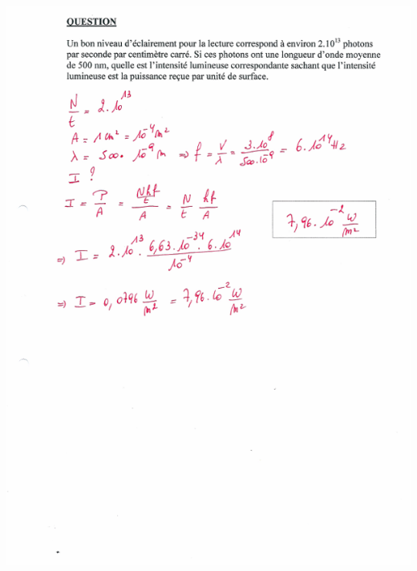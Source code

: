{\includegraphics[width=17.498cm,height=24.13cm]{Pictures/10000001000002570000033BCFBA7D32EF4FFF20.png}

}
